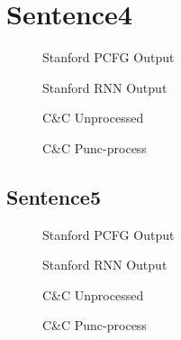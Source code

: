 \documentclass{article}
\begin{document}
\section{Sentence4}
\begin{figure}[h!]
\centering

\caption{Stanford PCFG Output}
\end{figure}
\begin{figure}[h!]
\centering

\caption{Stanford RNN Output}
\end{figure}
\begin{figure}[h!]
\centering

\caption{C\&C Unprocessed}
\end{figure}
\begin{figure}[h!]
\centering

\caption{C\&C Punc-process}
\end{figure}
\pagebreak

\begin{landscape}
\section{Sentence5}
\begin{figure}[!h]
    \center{%
        \resizebox{1.2\textwidth}{!}{}
    }
    \caption{Stanford PCFG Output}
\end{figure}

\begin{figure}[!h]
    \center{%
        \resizebox{1.2\textwidth}{!}{}
    }
    \caption{Stanford RNN Output}
\end{figure}

\pagebreak
\begin{figure}[!h]
    \center{%
        \resizebox{1.2\textwidth}{!}{}
    }
	\caption{C\&C Unprocessed}
\end{figure}

\begin{figure}[!h]
    \center{%
        \resizebox{1.2\textwidth}{!}{}
    }
	\caption{C\&C Punc-process}
\end{figure}
\end{landscape}
\pagebreak
\end{document}
